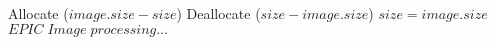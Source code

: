 \documentclass[a4paper, 40pt, landscape, conference]{IEEEtran}
\begin{document}
\begin{algorithmic}
\STATE Allocate ($image.size - size $)
\STATE Deallocate ($size - image.size $)
\ENDIF
\STATE $size = image.size$
\STATE $EPIC \; Image \; processing \dots$ 
\ENDWHILE
\end{algorithmic}
\end{document}

